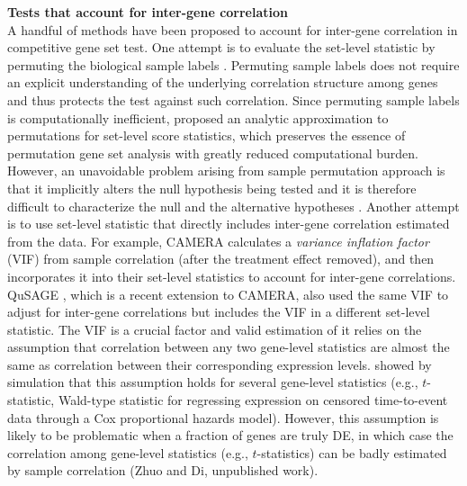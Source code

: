 \documentclass[a4,center,fleqn]{NAR}
\newcommand{\thepapertobefinished}{Zhuo and Di, unpublished work}
\begin{document}
	\textbf{Tests that account for inter-gene correlation}\\
	A handful of methods have been proposed to account for inter-gene correlation in competitive gene
	set test. One attempt is to evaluate the set-level statistic by permuting the biological sample
	labels \citep{subramanian2005gene, efron2007testing}. Permuting sample labels
	does not require an explicit understanding of the underlying correlation structure among genes and
	thus protects the test against such correlation. Since permuting sample labels is computationally
	inefficient, \cite{zhou2013empirical} proposed an analytic approximation to permutations for
	set-level score statistics, which preserves the essence of permutation gene set analysis with
	greatly reduced computational burden. However, an unavoidable problem arising from sample
	permutation approach is that it implicitly alters the null hypothesis being tested and it is
	therefore difficult to characterize the null and the alternative hypotheses
	\citep{goeman2007analyzing, khatri2012ten, wu2012camera}. Another attempt is to use set-level
	statistic that directly includes inter-gene correlation estimated from the data. For example, CAMERA
	\citep{wu2012camera} calculates a \textit{variance inflation factor} (VIF) from sample correlation
	(after the treatment effect removed), and then incorporates it into their set-level statistics to
	account for inter-gene correlations. QuSAGE \citep{yaari2013quantitative}, which is a recent
	extension to CAMERA, also used the same VIF to adjust for inter-gene correlations but includes the
	VIF in a different set-level statistic. The VIF is a crucial factor and valid estimation of it
	relies on the assumption that correlation between any two gene-level statistics are almost the same as
	correlation between their corresponding expression levels. \citet{barry2008statistical} showed by simulation
	that this assumption holds for several gene-level statistics
	(e.g., $t$-statistic, Wald-type statistic for regressing expression on censored time-to-event data
	through a Cox proportional hazards model). However, this assumption is likely to be problematic when a fraction of genes are 
	truly DE, in which case the correlation among gene-level
	statistics (e.g., $t$-statistics) can be badly estimated by sample correlation (\thepapertobefinished). 
	
	
	
\end{document}

